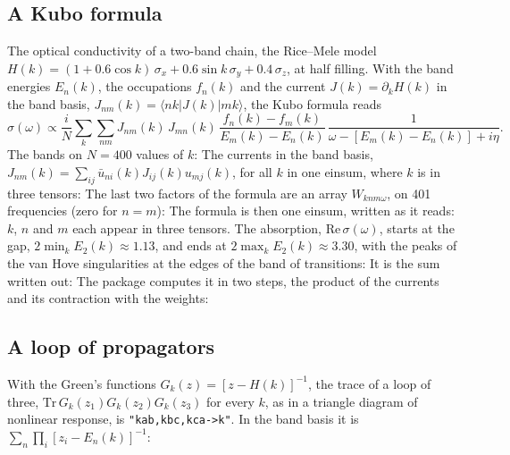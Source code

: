 \documentclass[11pt,a4paper]{article}
\begin{document}
\subsection{A Kubo formula}
The optical conductivity of a two-band chain, the Rice--Mele model~\cite{RM82}
$H(k)=(1+0.6\cos k)\,\sigma_x+0.6\sin k\,\sigma_y+0.4\,\sigma_z$, at half filling. With the band energies $E_n(k)$, the
occupations $f_n(k)$ and the current $J(k)=\partial_kH(k)$ in the band basis, $J_{nm}(k)=\langle nk|J(k)|mk\rangle$, the
Kubo formula reads
\[
\sigma(\omega)\propto\frac iN\sum_k\sum_{nm}J_{nm}(k)\,J_{mn}(k)\,\frac{f_n(k)-f_m(k)}{E_m(k)-E_n(k)}\,
\frac1{\omega-[E_m(k)-E_n(k)]+i\eta}.
\]
The bands on $N=400$ values of $k$:
The currents in the band basis, $J_{nm}(k)=\sum_{ij}\bar u_{ni}(k)J_{ij}(k)u_{mj}(k)$, for all $k$ in one einsum, where $k$
is in three tensors:
The last two factors of the formula are an array $W_{knm\omega}$, on 401 frequencies (zero for $n=m$):
The formula is then one einsum, written as it reads: $k$, $n$ and $m$ each appear in three tensors. The absorption,
$\mathrm{Re}\,\sigma(\omega)$, starts at the gap, $2\min_k E_2(k)\approx1.13$, and ends at $2\max_kE_2(k)\approx3.30$,
with the peaks of the van Hove singularities at the edges of the band of transitions:
It is the sum written out:
The package computes it in two steps, the product of the currents and its contraction with the weights:

\subsection{A loop of propagators}
With the Green's functions $G_k(z)=[z-H(k)]^{-1}$, the trace of a loop of three, $\mathrm{Tr}\,G_k(z_1)G_k(z_2)G_k(z_3)$
for every $k$, as in a triangle diagram of nonlinear response, is \texttt{"kab,kbc,kca->k"}. In the band basis it is
$\sum_n\prod_i[z_i-E_n(k)]^{-1}$:

\end{document}
